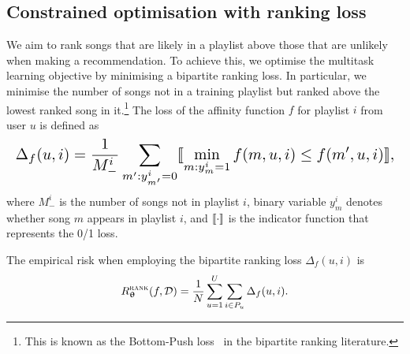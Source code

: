 \subsection{Constrained optimisation with ranking loss}

We aim to rank songs that are likely in a playlist above those that are unlikely when making a recommendation.
To achieve this, we optimise the multitask learning objective by minimising a bipartite ranking loss.
In particular, we minimise the number of songs not in a training playlist but ranked above the lowest 
ranked song in it.\footnote{This is known as the Bottom-Push loss~\cite{rudin2009p} in the bipartite ranking literature.}
The loss of the affinity function $f$ for playlist $i$ from user $u$ is defined as
\begin{equation*}
\resizebox{\columnwidth}{!}{$
\Delta_f(u, i) 
= \displaystyle \frac{1}{M_-^i} \sum_{m': y_{m'}^i = 0} \llb \min_{m: y_m^i = 1} f(m, u, i) \le f(m', u, i) \rrb,
$}
\end{equation*}
where $M_-^i$ is the number of songs not in playlist $i$,
binary variable $y_m^i$ denotes whether song $m$ appears in playlist $i$,
and $\llbracket \cdot \rrbracket$ is the indicator function that represents the 0/1 loss.

The empirical risk when employing the bipartite ranking loss %
$\Delta_f(u, i)$ is
\vspace{-1em}
\begin{equation}
\label{eq:risk_rank}
R_{{\bm{\uptheta}}}^{\textsc{rank}}(f, \mathcal{D}) = \frac{1}{N} \sum_{u=1}^U \sum_{i \in P_u} \Delta_f(u, i).
\end{equation}
%
%

